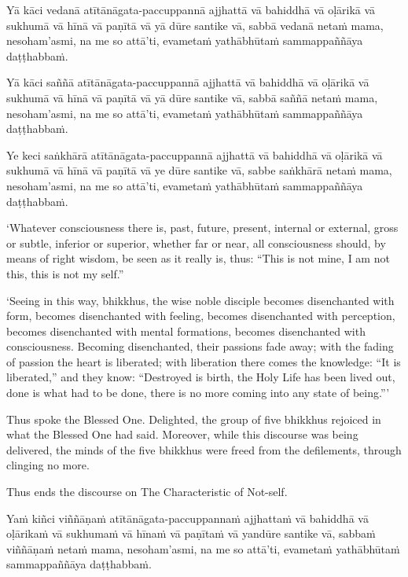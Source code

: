 Yā kāci vedanā atītānāgata-paccuppannā ajjhattā vā bahiddhā vā oḷārikā
vā sukhumā vā hīnā vā paṇītā vā yā dūre santike vā, sabbā vedanā netaṁ
mama, nesoham'asmi, na me so attā'ti, evametaṁ yathābhūtaṁ sammappaññāya
daṭṭhabbaṁ.

Yā kāci saññā atītānāgata-paccuppannā ajjhattā vā bahiddhā vā oḷārikā vā
sukhumā vā hīnā vā paṇītā vā yā dūre santike vā, sabbā saññā netaṁ mama,
nesoham'asmi, na me so attā'ti, evametaṁ yathābhūtaṁ sammappaññāya
daṭṭhabbaṁ.

Ye keci saṅkhārā atītānāgata-paccuppannā ajjhattā vā bahiddhā vā oḷārikā
vā sukhumā vā hīnā vā paṇītā vā ye dūre santike vā, sabbe saṅkhārā netaṁ
mama, nesoham'asmi, na me so attā'ti, evametaṁ yathābhūtaṁ sammappaññāya
daṭṭhabbaṁ.

\clearpage

\englishText
\markboth{\englishTitle}{\rightmark}

‘Whatever consciousness there is, past, future, present, internal or
external, gross or subtle, inferior or superior, whether far or near,
all consciousness should, by means of right wisdom, be seen as it really
is, thus: “This is not mine, I am not this, this is not my self.”

‘Seeing in this way, bhikkhus, the wise noble disciple becomes
disenchanted with form, becomes disenchanted with feeling, becomes
disenchanted with perception, becomes disenchanted with mental
formations, becomes disenchanted with consciousness. Becoming
disenchanted, their passions fade away; with the fading of passion the
heart is liberated; with liberation there comes the knowledge: “It is
liberated,” and they know: “Destroyed is birth, the Holy Life has been
lived out, done is what had to be done, there is no more coming into any
state of being.”\thinspace ’

Thus spoke the Blessed One. Delighted, the group of five bhikkhus
rejoiced in what the Blessed One had said. Moreover, while this discourse was
being delivered, the minds of the five bhikkhus were freed from the
defilements, through clinging no more.

Thus ends the discourse on The Characteristic of Not-self.

\clearpage

\paliText
\markboth{\paliTitle}{\rightmark}

Yaṁ kiñci viññāṇaṁ atītānāgata-paccuppannaṁ ajjhattaṁ vā bahiddhā vā
oḷārikaṁ vā sukhumaṁ vā hīnaṁ vā paṇītaṁ vā yandūre santike vā, sabbaṁ
viññāṇaṁ netaṁ mama, nesoham'asmi, na me so attā'ti, evametaṁ yathābhūtaṁ
sammappaññāya daṭṭhabbaṁ.

